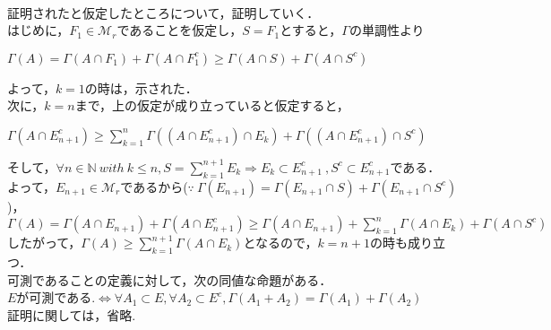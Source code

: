 \documentclass[11pt, a4paper, dvipdfmx]{jsarticle}
\theoremstyle{definition}
\newcommand{\N}{\mathbb{N}}
\begin{document}
\\
証明されたと仮定したところについて，証明していく．\\
はじめに，$F_1 \in \mathcal{M}_r$であることを仮定し，$S = F_1$とすると，$\Gamma$の単調性より\\
\begin{center}
  $\Gamma(A) = \Gamma(A\cap F_1)+\Gamma(A\cap F_1^c) \ge \Gamma(A\cap S)+\Gamma(A\cap S^c)$
\end{center}
よって，$k=1$の時は，示された．\\
次に，$k=n$まで，上の仮定が成り立っていると仮定すると，
\begin{center}
  $\Gamma(A\cap E_{n+1}^c)\ge \sum^{n}_{k=1}\Gamma((A\cap E_{n+1}^c)\cap E_k)+\Gamma((A\cap E_{n+1}^c)\cap S^c)$
\end{center}
そして，$\forall n\in \N ~with~ k\le n,S = \sum^{n+1}_{k=1}E_k \Rightarrow E_k \subset E_{n+1}^c~,S^c \subset E_{n+1}^c$である．\\
よって，$E_{n+1} \in \mathcal{M}_r$であるから($\because~ \Gamma(E_{n+1})= \Gamma(E_{n+1}\cap S)+\Gamma(E_{n+1}\cap S^c)$)，\\
$\Gamma(A) = \Gamma(A\cap E_{n+1})+\Gamma(A\cap E_{n+1}^c) \ge \Gamma(A\cap E_{n+1})+\sum^{n}_{k=1}\Gamma(A\cap E_k)+\Gamma(A\cap S^c)$
したがって，$\Gamma(A)\ge \sum^{n+1}_{k=1}\Gamma(A\cap E_k)$となるので，$k = n+1$の時も成り立つ．\\

 可測であることの定義に対して，次の同値な命題がある．\\
 \Proposition
 $E$が可測である.$\Leftrightarrow \forall A_1 \subset E, \forall A_2 \subset E^c,\Gamma(A_1+A_2) = \Gamma(A_1)+\Gamma(A_2)$\\
 証明に関しては，省略.\\
\end{document}
